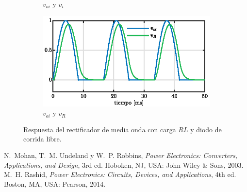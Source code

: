\documentclass[conference]{IEEEtran}
\begin{document}
\begin{figure}[ht]
\begin{subfigure}[t]{0.5\textwidth}
    \caption{$v_{oi}$ y $v_i$}
    \label{fig:voi-vi}
  \end{subfigure}\hfill
  \begin{subfigure}[t]{0.5\textwidth}
    \centering
    \includegraphics[width=\linewidth]{figuras/voi_vr.eps}
    \caption{$v_{oi}$ y $v_R$}
    \label{fig:voi-vr}
  \end{subfigure}
  \caption{Respuesta del rectificador de media onda con carga $RL$ y diodo de corrida libre.}
  \label{fig:rectificador-subfigs}
\end{figure}







\begin{thebibliography}{plain}
N.~Mohan, T.~M. Undeland y W.~P. Robbins,
\textit{Power Electronics: Converters, Applications, and Design},
3rd ed. Hoboken, NJ, USA: John Wiley \& Sons, 2003.
M.~H. Rashid, \textit{Power Electronics: Circuits, Devices, and Applications},
4th ed. Boston, MA, USA: Pearson, 2014.

\end{thebibliography}
\end{document}
